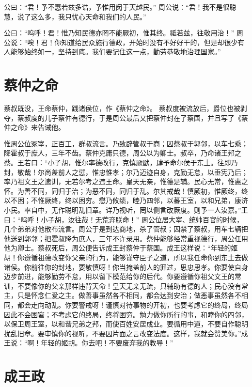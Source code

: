 \documentclass[12pt,UTF8]{ctexbook}
\begin{document}
公曰：“君！予不惠若兹多诰，予惟用闵于天越民。”
周公说：“君！我不是很聪慧，说了这么多，我只忧心天命和我们的人民。”

公曰：“呜呼！君！惟乃知民德亦罔不能厥初，惟其终。祗若兹，往敬用治！”
周公说：“唉！君！你知道给民众施行德政，开始时没有不好好干的，但是却很少有人能够始终如一，坚持到底。我们要记住这一点，勤劳恭敬地治理国家。”

\chapter{蔡仲之命}

蔡叔既没，王命蔡仲，践诸侯位，作《蔡仲之命》。
蔡叔度被流放后，爵位也被剥夺，蔡叔度的儿子蔡仲有德行，于是周公最后又把蔡仲封在了蔡国，并且写了《蔡仲之命》来告诫他。

惟周公位冢宰，正百工，群叔流言。乃致辟管叔于商；囚蔡叔于郭邻，以车七乘；降霍叔于庶人，三年不齿。蔡仲克庸只德，周公以为卿士。叔卒，乃命诸王邦之蔡。王若曰：“小子胡，惟尔率德改行，克慎厥猷，肆予命尔侯于东土。往即乃封，敬哉！尔尚盖前人之愆，惟忠惟孝；尔乃迈迹自身，克勤无怠，以垂宪乃后；率乃祖文王之遗训，无若尔考之违王命。皇天无亲，惟德是辅。民心无常，惟惠之怀。为善不同，同归于治；为恶不同，同归于乱。尔其戒哉！慎厥初，惟厥终，终以不困；不惟厥终，终以困穷。懋乃攸绩，睦乃四邻，以蕃王室，以和兄弟，康济小民。率自中，无作聪明乱旧章。详乃视听，罔以侧言改厥度。则予一人汝嘉。”王曰：“呜呼！小子胡，汝往哉！无荒弃朕命！”
周公位居大宰、统帅百官的时候，几个弟弟对他散布流言。周公于是到达商地，杀了管叔；囚禁了蔡叔，用车七辆把他送到郭邻；把霍叔降为庶人，三年不许录用。蔡仲能够经常重视德行，周公任用他为卿士。蔡叔死后，周公便告诉成王封蔡仲于蔡国。成王这样说：“年轻的姬胡！你遵循祖德改变你父亲的行为，能够谨守臣子之道，所以我任命你到东土去做诸侯。你前往你的封地，要敬慎呀！你当掩盖前人的罪过，思忠思孝。你要使自身迈步前进，能够勤劳不怠，用以留下模范给你的后代。你要遵循你祖父文王的常训，不要像你的父亲那样违背天命！皇天无亲无疏，只辅助有德的人；民心没有常主，只是怀念仁爱之主。做善事虽然各不相同，都会达到安治；做恶事虽然各不相同，都会走向动乱。你要警戒呀！谨慎对待事物的开初，也要考虑它的终局，终局因此不会困窘；不考虑它的终局，终将困穷。勉力做你所行的事，和睦你的四邻，以保卫周王室，以和谐兄弟之邦，而使百姓安居成业。要循用中道，不要自作聪明扰乱旧章。要审慎你的视听，不要因片面之言改变法度。这样，我就会赞美你。”成王说：“啊！年轻的姬胡。你去吧！不要废弃我的教导！”

\chapter{成王政}
\end{document}
